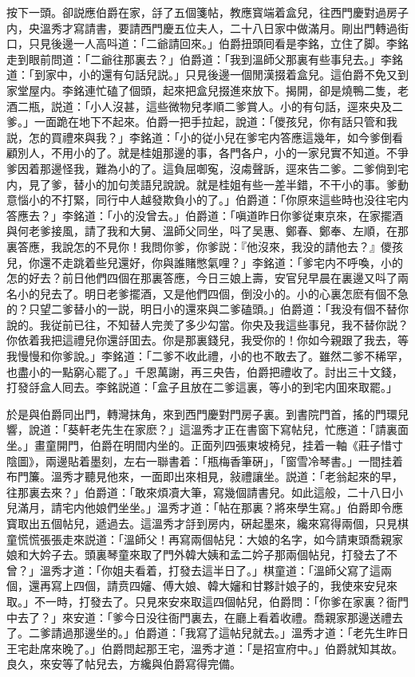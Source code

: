 按下一頭。卻説應伯爵在家，㧱了五個箋帖，教應寳端着盒兒，往西門慶對過房子内，央溫秀才寫請書，要請西門慶五位夫人，二十八日家中做滿月。剛出門轉過街口，只見後邊一人高呌道：「二爺請回來。」伯爵扭頭囘看是李銘，立住了脚。李銘走到眼前問道：「二爺往那裏去？」伯爵道：「我到溫師父那裏有些事兒去。」李銘道：「到家中，小的還有句話兒説。」只見後邊一個閒漢掇着盒兒。這伯爵不免又到家堂屋内。李銘連忙磕了個頭，起來把盒兒掇進來放下。揭開，卻是燒鴨二隻，老酒二瓶，説道：「小人沒甚，這些微物兒孝順二爹賞人。小的有句話，逕來央及二爹。」一面跪在地下不起來。伯爵一把手拉起，說道：「儍孩兒，你有話只管和我説，怎的買禮來與我？」李銘道：「小的従小兒在爹宅内答應這幾年，如今爹倒看顧別人，不用小的了。就是桂姐那邊的事，各門各户，小的一家兒實不知道。不爭爹因着那邊怪我，難為小的了。這負屈啣寃，沒䖏聲訴，逕來告二爹。二爹倘到宅内，見了爹，替小的加句羙語兒說說。就是桂姐有些一差半錯，不干小的事。爹動意惱小的不打緊，同行中人越發欺負小的了。」伯爵道：「你原來這些時也没往宅内答應去？」李銘道：「小的没曾去。」伯爵道：「嗔道昨日你爹従東京來，在家擺酒與何老爹接風，請了我和大舅、溫師父同坐，呌了吴惠、鄭春、鄭奉、左順，在那裏答應，我說怎的不見你！我問你爹，你爹説：『他沒來，我没的請他去？』儍孩兒，你還不走跳着些兒還好，你與誰賭憋氣哩？」李銘道：「爹宅内不呼喚，小的怎的好去？前日他們四個在那裏答應，今日三娘上壽，安官兒早晨在裏邊又呌了兩名小的兒去了。明日老爹擺酒，又是他們四個，倒没小的。小的心裏怎麽有個不急的？只望二爹替小的一説，明日小的還來與二爹磕頭。」伯爵道：「我没有個不替你說的。我従前已往，不知替人完羙了多少勾當。你央及我這些事兒，我不替你説？你依着我把這禮兒你還㧱囬去。你是那裏錢兒，我受你的！你如今親跟了我去，等我慢慢和你爹說。」李銘道：「二爹不收此禮，小的也不敢去了。雖然二爹不稀罕，也盡小的一點窮心罷了。」千恩萬謝，再三央告，伯爵把禮收了。討出三十文錢，打發㧱盒人囘去。李銘説道：「盒子且放在二爹這裏，等小的到宅内囬來取罷。」

於是與伯爵同出門，轉灣抹角，來到西門慶對門房子裏。到書院門首，搖的門環兒響，說道：「葵軒老先生在家麽？」這溫秀才正在書窗下寫帖兒，忙應道：「請裏面坐。」畫童開門，伯爵在明間内坐的。正面列四張東坡椅兒，挂着一軸《莊子惜寸陰圖》，兩邊貼着墨刻，左右一聯書着：「瓶梅香筆硏」，「窗雪冷琴書。」一間挂着布門簾。溫秀才聽見他來，一面即出來相見，敍禮讓坐。説道：「老翁起來的早，往那裏去來？」伯爵道：「敢來煩凟大筆，寫幾個請書兒。如此這般，二十八日小兒滿月，請宅内他娘們坐坐。」溫秀才道：「帖在那裏？將來學生寫。」伯爵即令應寳取出五個帖兒，遞過去。這溫秀才㧱到房内，硏起墨來，纔來寫得兩個，只見棋童慌慌張張走來説道：「溫師父！再寫兩個帖兒：大娘的名字，如今請東頭喬親家娘和大妗子去。頭裏琴童來取了門外韓大姨和孟二妗子那兩個帖兒，打發去了不曾？」溫秀才道：「你姐夫看着，打發去這半日了。」棋童道：「溫師父寫了這兩個，還再寫上四個，請贲四嬸、傅大娘、韓大嬸和甘夥計娘子的，我使來安兒來取。」不一時，打發去了。只見來安來取這四個帖兒，伯爵問：「你爹在家裏？衙門中去了？」來安道：「爹今日没往衙門裏去，在廳上看着收禮。喬親家那邊送禮去了。二爹請過那邊坐的。」伯爵道：「我寫了這帖兒就去。」溫秀才道：「老先生昨日王宅赴席來晚了。」伯爵問起那王宅，溫秀才道：「是招宣府中。」伯爵就知其故。良久，來安等了帖兒去，方纔與伯爵寫得完備。

